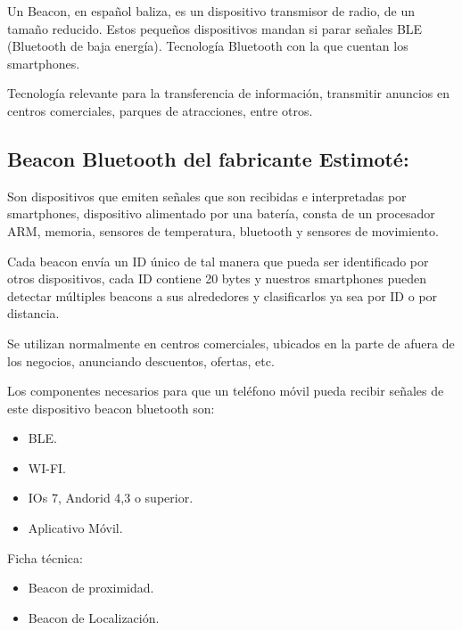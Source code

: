 \documentclass[conference,compsoc,onecolumn]{IEEEtran}
\begin{document}
 Un Beacon, en español baliza, es un dispositivo transmisor de radio, de un tamaño reducido. Estos
pequeños dispositivos mandan si parar señales BLE (Bluetooth de baja energía). Tecnología Bluetooth
con la que cuentan los smartphones.

\enskip

Tecnología relevante para la transferencia de información, transmitir anuncios en centros comerciales,
parques de atracciones, entre otros.
 

 
 \subsection{Beacon Bluetooth del fabricante Estimoté:}
 

 Son dispositivos que emiten señales que son recibidas e interpretadas por smartphones, dispositivo
alimentado por una batería, consta de un procesador ARM, memoria, sensores de temperatura,
bluetooth y sensores de movimiento.

\enskip

Cada beacon envía un ID único de tal manera que pueda ser identificado por otros dispositivos, cada
ID contiene 20 bytes y nuestros smartphones pueden detectar múltiples beacons a sus alrededores y
clasificarlos ya sea por ID o por distancia.

\enskip

Se utilizan normalmente en centros comerciales, ubicados en la parte de afuera de los negocios,
anunciando descuentos, ofertas, etc.

\enskip

Los componentes necesarios para que un teléfono móvil pueda recibir señales de este dispositivo
beacon bluetooth son:

\begin{itemize}
    \item BLE.
    \item WI-FI.
    \item IOs 7, Andorid 4,3 o superior.
    \item Aplicativo Móvil.
\end{itemize}



Ficha técnica:

\begin{itemize}
    \item Beacon de proximidad.
    \item Beacon de Localización.
\end{itemize}
\end{document}
